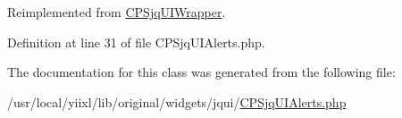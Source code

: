 Reimplemented from \hyperlink{classCPSjqUIWrapper_ae357f9dc377f7de0d12010b2ced28cbc}{CPSjqUIWrapper}.



Definition at line 31 of file CPSjqUIAlerts.php.



The documentation for this class was generated from the following file:\begin{DoxyCompactItemize}
\item 
/usr/local/yiixl/lib/original/widgets/jqui/\hyperlink{CPSjqUIAlerts_8php}{CPSjqUIAlerts.php}\end{DoxyCompactItemize}
